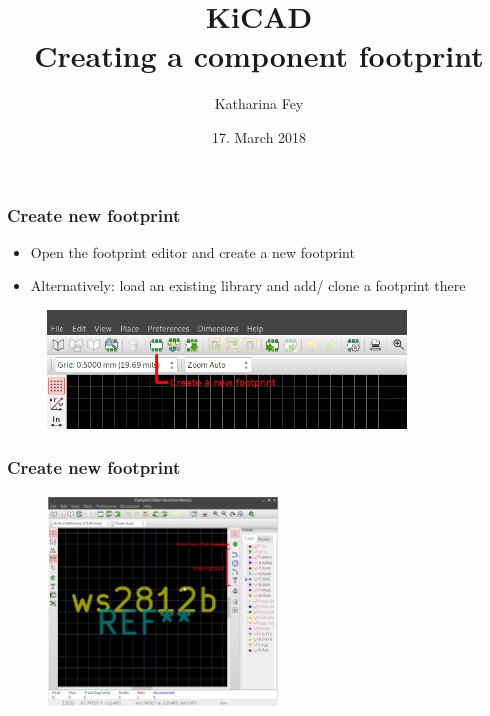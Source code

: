 \documentclass{beamer}
\begin{document}
\title{KiCAD\\Creating a component footprint}
\author{Katharina Fey}
\date{17. March 2018}

\frame{\titlepage}

\begin{frame}
  \frametitle{Create new footprint}
  \begin{itemize}
    \item Open the footprint editor and create a new footprint
    \item Alternatively: load an existing library and add/ clone a footprint there
  \end{itemize}
  \begin{figure}[H]
    \centering
    \includegraphics[width=0.85\textwidth]{images/step_01.png}
  \end{figure}
\end{frame}


\begin{frame}
  \frametitle{Create new footprint}
  \begin{figure}[H]
    \centering
    \includegraphics[width=0.55\textwidth]{images/step_02.png}
  \end{figure}
\end{frame}
\end{document}
